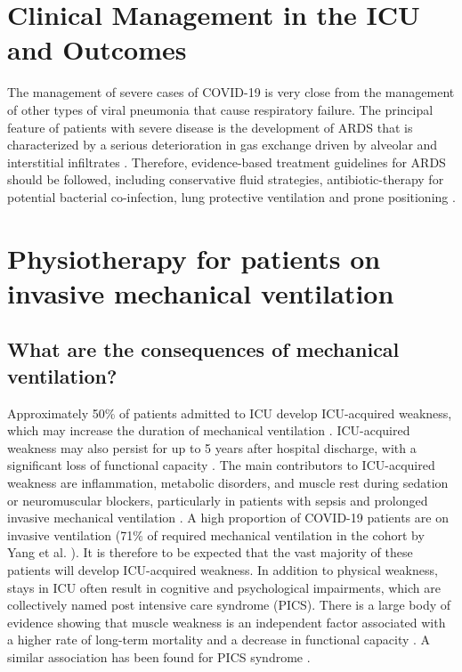 \section{Clinical Management in the ICU and Outcomes}

The management of severe cases of COVID-19 is very close from the management of other types of viral pneumonia that cause respiratory failure. The principal feature of patients with severe disease is the development of ARDS that is  characterized by a serious deterioration in gas exchange driven by alveolar and interstitial infiltrates \cite{ashbaugh_acute_1967}. Therefore, evidence-based treatment guidelines for ARDS should be followed, including conservative fluid strategies, antibiotic-therapy for potential bacterial co-infection, lung protective ventilation and prone positioning \cite{fan_official_2017}.

\section{Physiotherapy for patients on invasive mechanical ventilation}
\subsection{What are the consequences of mechanical ventilation?}
Approximately 50\% of patients admitted to ICU develop ICU-acquired weakness, which may increase the duration of mechanical ventilation \cite{zorowitz_icuacquired_2016}. ICU-acquired weakness may also persist for up to 5 years after hospital discharge, with a significant loss of functional capacity \cite{herridge_functional_2011}. The main contributors to ICU-acquired weakness are inflammation, metabolic disorders, and muscle rest during sedation or neuromuscular blockers, particularly in patients with sepsis and prolonged invasive mechanical ventilation \cite{batt_mechanism_2017,batt_intensive_2013}. A high proportion of COVID-19 patients are on invasive ventilation (71\% of required mechanical ventilation in the cohort by Yang et al. \cite{yang_clinical_2020}). It is therefore to be expected that the vast majority of these patients will develop ICU-acquired weakness. In addition to physical weakness, stays in ICU often result in cognitive and psychological impairments, which are collectively named post intensive care syndrome (PICS). There is a large body of evidence showing that muscle weakness is an independent factor associated with a higher rate of long-term mortality and a decrease in functional capacity \cite{vanhorebeek2020icu,van_aerde_five-year_2020}. A similar association has been found for PICS syndrome \cite{smith_home_2020}.

